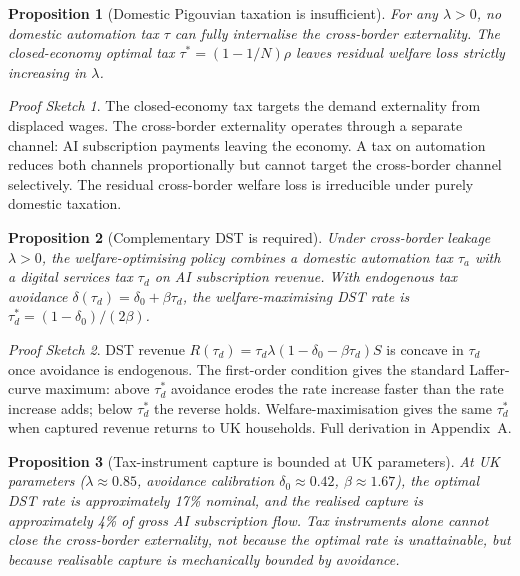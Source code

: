 \documentclass[11pt,letterpaper]{article}
\newtheorem{proposition}{Proposition}
\theoremstyle{remark}
\newtheorem*{proof_sketch}{Proof Sketch}
\begin{document}
\begin{proposition}[Domestic Pigouvian taxation is insufficient]\label{prop:domestic_insufficient}
For any $\lambda > 0$, no domestic automation tax $\tau$ can fully internalise the cross-border externality. The closed-economy optimal tax $\tau^* = (1 - 1/N) \rho$ leaves residual welfare loss strictly increasing in $\lambda$.
\end{proposition}

\begin{proof_sketch}
The closed-economy tax targets the demand externality from displaced wages. The cross-border externality operates through a separate channel: {AI} subscription payments leaving the economy. A tax on automation reduces both channels proportionally but cannot target the cross-border channel selectively. The residual cross-border welfare loss is irreducible under purely domestic taxation.
\end{proof_sketch}

\begin{proposition}[Complementary {DST} is required]\label{prop:dst}
Under cross-border leakage $\lambda > 0$, the welfare-optimising policy combines a domestic automation tax $\tau_a$ with a digital services tax $\tau_d$ on {AI} subscription revenue. With endogenous tax avoidance $\delta(\tau_d) = \delta_0 + \beta \tau_d$, the welfare-maximising {DST} rate is $\tau_d^* = (1 - \delta_0) / (2\beta)$.
\end{proposition}

\begin{proof_sketch}
DST revenue $R(\tau_d) = \tau_d \lambda (1 - \delta_0 - \beta \tau_d) S$ is concave in $\tau_d$ once avoidance is endogenous. The first-order condition gives the standard Laffer-curve maximum: above $\tau_d^*$ avoidance erodes the rate increase faster than the rate increase adds; below $\tau_d^*$ the reverse holds. Welfare-maximisation gives the same $\tau_d^*$ when captured revenue returns to UK households. Full derivation in Appendix~A.
\end{proof_sketch}

\begin{proposition}[Tax-instrument capture is bounded at UK parameters]\label{prop:infeasible}
At {UK} parameters ($\lambda \approx 0.85$, avoidance calibration $\delta_0 \approx 0.42$, $\beta \approx 1.67$), the optimal {DST} rate is approximately 17\% nominal, and the realised capture is approximately 4\% of gross AI subscription flow. Tax instruments alone cannot close the cross-border externality, not because the optimal rate is unattainable, but because realisable capture is mechanically bounded by avoidance.
\end{proposition}
\end{document}
